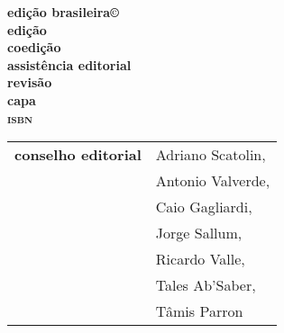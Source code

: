 \newcommand{\linha}[2]{\ifdef{#2}{\linhalayout{#1}{#2}}{}}

\begingroup\tiny
\parindent=0cm
\thispagestyle{empty}

\textbf{edição brasileira©}\\


\textbf{edição}\\
\textbf{coedição}\\
\textbf{assistência editorial}\\
\textbf{revisão}\\
\textbf{capa}\\

\textbf{\textsc{isbn}}

\hspace{-5pt}\begin{tabular}{ll}
\textbf{conselho editorial} & Adriano Scatolin,  \\
							& Antonio Valverde,  \\
							& Caio Gagliardi,    \\
							& Jorge Sallum,      \\
							& Ricardo Valle,     \\
							& Tales Ab'Saber,    \\
							& Tâmis Parron      
\end{tabular}
 
